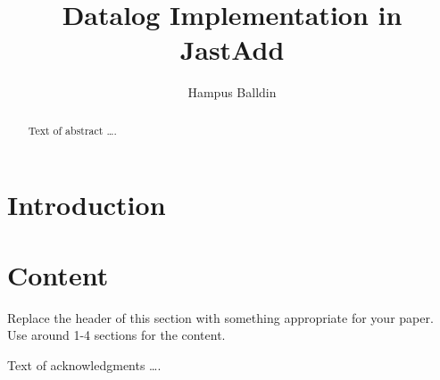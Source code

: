 \documentclass[sigplan,10pt]{acmart}
\begin{document}
\title[Short Title]{Datalog Implementation in JastAdd}         %



\author{Hampus Balldin}


\begin{abstract}
Text of abstract \ldots.
\end{abstract}


\maketitle
\section{Introduction}

\section{Content}
Replace the header of this section with something appropriate for your paper. Use around 1-4 sections for the content.
\begin{acks}
Text of acknowledgments \ldots.
\end{acks}



\end{document}
